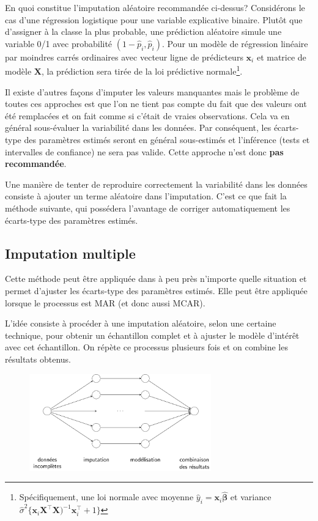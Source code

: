 \documentclass[
  11pt,
  letterpaper,
]{scrbook}
\theoremstyle{definition}
\theoremstyle{remark}
\begin{document}
En quoi constitue l'imputation aléatoire recommandée ci-dessus?
Considérons le cas d'une régression logistique pour une variable
explicative binaire. Plutôt que d'assigner à la classe la plus probable,
une prédiction aléatoire simule une variable 0/1 avec probabilité
\((1-\widehat{p}_i, \widehat{p}_i)\). Pour un modèle de régression
linéaire par moindres carrés ordinaires avec vecteur ligne de
prédicteurs \(\mathbf{x}_i\) et matrice de modèle \(\mathbf{X}\), la
prédiction sera tirée de la loi prédictive normale\footnote{Spécifiquement,
  une loi normale avec moyenne
  \(\widehat{y}_i=\mathbf{x}_i\widehat{\boldsymbol{\beta}}\) et variance
  \(\widehat{\sigma}^2\{\mathbf{x}_i\mathbf{X}^\top\mathbf{X})^{-1}\mathbf{x}_i^\top + 1\}\)}.

Il existe d'autres façons d'imputer les valeurs manquantes mais le
problème de toutes ces approches est que l'on ne tient pas compte du
fait que des valeurs ont été remplacées et on fait comme si c'était de
vraies observations. Cela va en général sous-évaluer la variabilité dans
les données. Par conséquent, les écarts-type des paramètres estimés
seront en général sous-estimés et l'inférence (tests et intervalles de
confiance) ne sera pas valide. Cette approche n'est donc \textbf{pas
recommandée}.

Une manière de tenter de reproduire correctement la variabilité dans les
données consiste à ajouter un terme aléatoire dans l'imputation. C'est
ce que fait la méthode suivante, qui possédera l'avantage de corriger
automatiquement les écarts-type des paramètres estimés.

\hypertarget{imputation-multiple}{%
\subsection{Imputation multiple}\label{imputation-multiple}}

Cette méthode peut être appliquée dans à peu près n'importe quelle
situation et permet d'ajuster les écarts-type des paramètres estimés.
Elle peut être appliquée lorsque le processus est MAR (et donc aussi
MCAR).

L'idée consiste à procéder à une imputation aléatoire, selon une
certaine technique, pour obtenir un échantillon complet et à ajuster le
modèle d'intérêt avec cet échantillon. On répète ce processus plusieurs
fois et on combine les résultats obtenus.

\begin{figure}[ht!]

{\centering \includegraphics[width=0.7\textwidth,height=\textheight]{figures/donnees_manquantes_workflow.png}

}

\end{figure}
\end{document}

